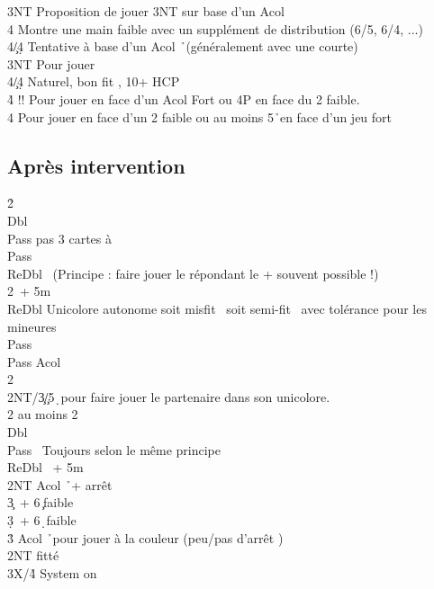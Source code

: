 \documentclass[a4paper]{article}
\begin{document}
\begin{bidtable}
3NT \> Proposition de jouer 3NT sur base d'un Acol \h \\
4\s \> Montre une main faible avec un supplément de distribution (6/5, 6/4, ...)\\
4\c/4\d \> Tentative à base d'un Acol \h\ (généralement avec une courte)\-\\
3NT \> Pour jouer\\
4\c/4\d \> Naturel, bon fit \s , 10+ HCP\\
4\h \> !! Pour jouer en face d'un Acol Fort ou 4P en face du 2 faible.\\
4\s \> Pour jouer en face d'un 2 faible ou au moins 5\h\ en face d'un jeu fort\-
\end{bidtable}

\subsection{Après intervention}

\begin{bidtable}
2\h\+\\
Dbl\+\\
Pass \> pas 3 cartes à \s \+\\
Pass\+\\
ReDbl \s\ (Principe : faire jouer le répondant le + souvent possible !)\\
2\s {}\s\ + 5m\-\-\\
ReDbl \> Unicolore autonome soit misfit \s\ soit semi-fit \s\ avec tolérance pour les mineures\+\\
Pass\+\\
Pass \> Acol \h \\
2\s {}\s \\
2NT/3\c {}\c /5\d\ pour faire jouer le partenaire dans son unicolore.\-\-\\
2\s \> au moins 2\s \+\\
Dbl\+\\
Pass \s\ Toujours selon le même principe\\
ReDbl \s\ + 5m\\
2NT \> Acol \h\ + arrêt \s \\
3\c {}\s\ + 6\c\ faible\\
3\d {}\s\ + 6\d\ faible\\
3\h \> Acol \h\ pour jouer à la couleur (peu/pas d'arrêt \s )\-\-\\
2NT \> fitté\\
3X/4\h \> System on\-\-
\end{bidtable}
\end{document}
